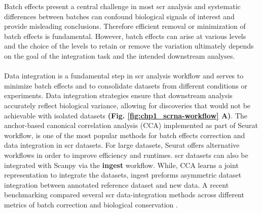 Batch effects present a central challenge in most \gls{scr} analysis and systematic differences between batches can confound biological signals of interest and provide misleading conclusions. Therefore
efficient removal or minimization of batch effects is fundamental. However, batch effects can arise at various levels and the choice of the levels to retain or remove the variation ultimately depends on the goal of the integration task and the intended downstream analyses.\\\\
Data integration is a fundamental step in \gls{scr} analysis workflow and serves to minimize batch effects and to consolidate datasets from different conditions or experiments. 
Data integration strategies ensure that downstream analysis accurately reflect biological variance, allowing for discoveries that would not be achievable with isolated datasets \textbf{(Fig. \ref{fig:chp1_scrna-workflow} A)}.  %
The anchor-based canonical correlation analysis (CCA) implemented as part of Seurat \textbf{\cite{stuart_comprehensive_2019}} workflow, is one of the most popular methods for batch effects correction and data integration in \gls{scr} datasets. For large datasets, Seurat offers alternative workflows in order to improve efficiency and runtimes. \gls{scr} datasets can also be integrated with Scanpy via the \textbf{ingest} workflow. %
While, CCA learns a joint representation to integrate the datasets, ingest preforms asymmetric dataset integration between annotated reference dataset and new data. A recent benchmarking compared several \gls{scr} data-integration methods across different metrics of batch correction and biological conservation \textbf{\cite{luecken_benchmarking_2021}}.\\

